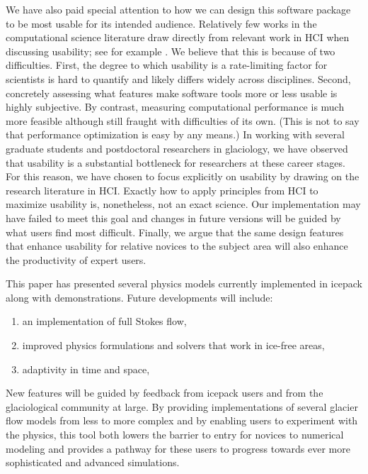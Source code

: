 \documentclass[journal abbreviation, manuscript]{copernicus}
\begin{document}
We have also paid special attention to how we can design this software package to be most usable for its intended audience.
Relatively few works in the computational science literature draw directly from relevant work in HCI when discussing usability; see for example \citet{hannay2009scientists, harris2020array}.
We believe that this is because of two difficulties.
First, the degree to which usability is a rate-limiting factor for scientists is hard to quantify and likely differs widely across disciplines.
Second, concretely assessing what features make software tools more or less usable is highly subjective.
By contrast, measuring computational performance is much more feasible although still fraught with difficulties of its own.
(This is not to say that performance optimization is easy by any means.)
In working with several graduate students and postdoctoral researchers in glaciology, we have observed that usability is a substantial bottleneck for researchers at these career stages.
For this reason, we have chosen to focus explicitly on usability by drawing on the research literature in HCI.
Exactly how to apply principles from HCI to maximize usability is, nonetheless, not an exact science.
Our implementation may have failed to meet this goal and changes in future versions will be guided by what users find most difficult.
Finally, we argue that the same design features that enhance usability for relative novices to the subject area will also enhance the productivity of expert users.

This paper has presented several physics models currently implemented in icepack along with demonstrations.
Future developments will include:
\begin{enumerate}
    \item an implementation of full Stokes flow,
    \item improved physics formulations and solvers that work in ice-free areas,
    \item adaptivity in time and space,
\end{enumerate}
New features will be guided by feedback from icepack users and from the glaciological community at large.
By providing implementations of several glacier flow models from less to more complex and by enabling users to experiment with the physics, this tool both lowers the barrier to entry for novices to numerical modeling and provides a pathway for these users to progress towards ever more sophisticated and advanced simulations.


\end{document}
